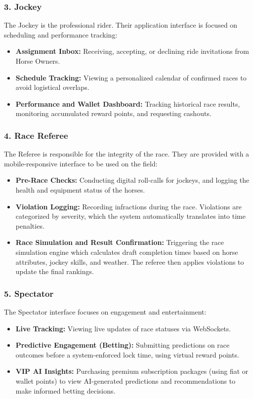 \documentclass{llncs}
\begin{document}
\subsubsection{3. Jockey}
The Jockey is the professional rider. Their application interface is focused on scheduling and performance tracking:
\begin{itemize}
    \item \textbf{Assignment Inbox:} Receiving, accepting, or declining ride invitations from Horse Owners.
    \item \textbf{Schedule Tracking:} Viewing a personalized calendar of confirmed races to avoid logistical overlaps.
    \item \textbf{Performance and Wallet Dashboard:} Tracking historical race results, monitoring accumulated reward points, and requesting cashouts.
\end{itemize}

\subsubsection{4. Race Referee}
The Referee is responsible for the integrity of the race. They are provided with a mobile-responsive interface to be used on the field:
\begin{itemize}
    \item \textbf{Pre-Race Checks:} Conducting digital roll-calls for jockeys, and logging the health and equipment status of the horses.
    \item \textbf{Violation Logging:} Recording infractions during the race. Violations are categorized by severity, which the system automatically translates into time penalties.
    \item \textbf{Race Simulation and Result Confirmation:} Triggering the race simulation engine which calculates draft completion times based on horse attributes, jockey skills, and weather. The referee then applies violations to update the final rankings.
\end{itemize}

\subsubsection{5. Spectator}
The Spectator interface focuses on engagement and entertainment:
\begin{itemize}
    \item \textbf{Live Tracking:} Viewing live updates of race statuses via WebSockets.
    \item \textbf{Predictive Engagement (Betting):} Submitting predictions on race outcomes before a system-enforced lock time, using virtual reward points.
    \item \textbf{VIP AI Insights:} Purchasing premium subscription packages (using fiat or wallet points) to view AI-generated predictions and recommendations to make informed betting decisions.
\end{itemize}
\end{document}

